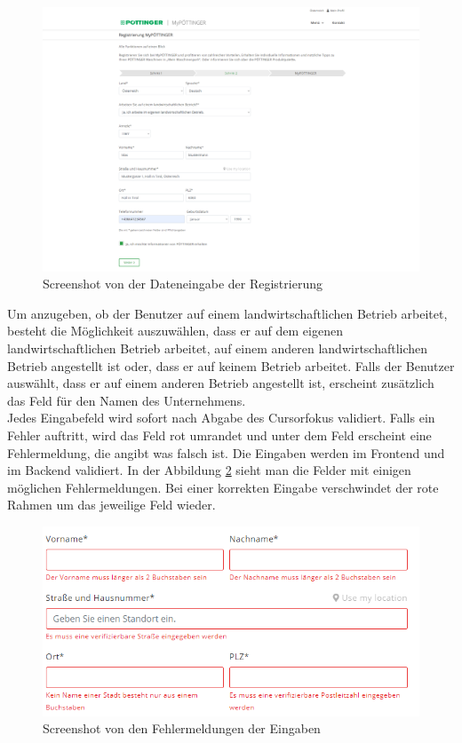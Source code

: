 \begin{figure}[H]
	\centerline{
		\includegraphics[width=1\textwidth, frame]{./grafiken/erm_register_data.png}
	}
	\vskip0pt
	\caption{Screenshot von der Dateneingabe der Registrierung} \label{fig:register2}
\end{figure}

Um anzugeben, ob der Benutzer auf einem landwirtschaftlichen Betrieb arbeitet, besteht die Möglichkeit auszuwählen, dass er auf dem eigenen landwirtschaftlichen Betrieb arbeitet, auf einem anderen landwirtschaftlichen Betrieb angestellt ist oder, dass er auf keinem Betrieb arbeitet. Falls der Benutzer auswählt, dass er auf einem anderen Betrieb angestellt ist, erscheint zusätzlich das Feld für den Namen des Unternehmens.\\
Jedes Eingabefeld wird sofort nach Abgabe des Cursorfokus validiert. Falls ein Fehler auftritt, wird das Feld rot umrandet und unter dem Feld erscheint eine Fehlermeldung, die angibt was falsch ist. Die Eingaben werden im Frontend und im Backend validiert. In der Abbildung \ref{fig:eingabeError} sieht man die Felder mit einigen möglichen Fehlermeldungen. Bei einer korrekten Eingabe verschwindet der rote Rahmen um das jeweilige Feld wieder.
\begin{figure}[H]
	\centerline{
		\includegraphics[width=1\textwidth, frame]{./grafiken/dateneingabe_Errors.PNG}
	}
	\vskip0pt
	\caption{Screenshot von den Fehlermeldungen der Eingaben} \label{fig:eingabeError}
\end{figure}

